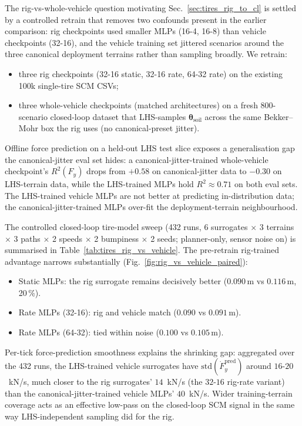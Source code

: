 \documentclass[conference,letterpaper,10pt]{IEEEtran}
\begin{document}
The rig-vs-whole-vehicle question motivating
Sec.~\ref{sec:tires_rig_to_cl} is settled by a controlled retrain
that removes two confounds present in the earlier comparison: rig
checkpoints used smaller MLPs (16-4, 16-8) than vehicle checkpoints
(32-16), and the vehicle training set jittered scenarios around the
three canonical deployment terrains rather than sampling broadly. We
retrain:

\begin{itemize}
\item three rig checkpoints (32-16 static, 32-16 rate, 64-32 rate) on
  the existing 100k single-tire SCM CSVs;
\item three whole-vehicle checkpoints (matched architectures) on a
  fresh 800-scenario closed-loop dataset that LHS-samples
  $\boldsymbol\theta_{\mathrm{soil}}$ across the same Bekker--Mohr box
  the rig uses (no canonical-preset jitter).
\end{itemize}

Offline force prediction on a held-out LHS test slice exposes a
generalisation gap the canonical-jitter eval set hides: a
canonical-jitter-trained whole-vehicle checkpoint's $R^2(F_y)$ drops from
$+0.58$ on canonical-jitter data to $-0.30$ on LHS-terrain data,
while the LHS-trained MLPs hold $R^2 \approx 0.71$ on both
eval sets. The LHS-trained vehicle MLPs are not better at predicting
in-distribution data; the canonical-jitter-trained MLPs over-fit the
deployment-terrain neighbourhood.

The controlled closed-loop tire-model sweep (432 runs, 6 surrogates
$\times$ 3 terrains $\times$ 3 paths $\times$ 2 speeds $\times$ 2
bumpiness $\times$ 2 seeds; planner-only, sensor noise on) is
summarised in Table~\ref{tab:tires_rig_vs_vehicle}. The pre-retrain
rig-trained advantage narrows substantially
(Fig.~\ref{fig:rig_vs_vehicle_paired}):

\begin{itemize}
\item Static MLPs: the rig surrogate remains decisively better
  ($0.090\,\mathrm{m}$ vs $0.116\,\mathrm{m}$, 20\,\%).
\item Rate MLPs (32-16): rig and vehicle match
  ($0.090$ vs $0.091\,\mathrm{m}$).
\item Rate MLPs (64-32): tied within noise
  ($0.100$ vs $0.105\,\mathrm{m}$).
\end{itemize}

Per-tick force-prediction smoothness explains the shrinking gap:
aggregated over the 432 runs, the LHS-trained vehicle surrogates have
$\mathrm{std}(\dot F_y^{\mathrm{pred}})$ around $16$-$20$~kN/s, much
closer to the rig surrogates' $14$~kN/s (the $32$-$16$ rig-rate
variant) than the canonical-jitter-trained vehicle MLPs' $40$~kN/s. Wider
training-terrain coverage acts as an effective low-pass on the
closed-loop SCM signal in the same way LHS-independent sampling did
for the rig.
\end{document}
